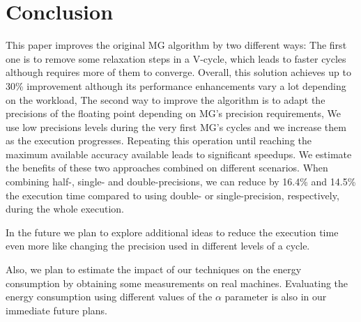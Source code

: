 \section{Conclusion}
\label{sec:conclusions}

This paper improves the original MG algorithm by two different ways: The first
one is to remove some relaxation steps in a V-cycle, which leads to faster
cycles although requires more of them to converge.  Overall, this solution
achieves up to 30\% improvement although its performance enhancements vary a
lot depending on the workload, The second way to improve the algorithm is to
adapt the precisions of the floating point depending on MG's precision
requirements, We use low precisions levels during the very first MG's cycles
and we increase them as the execution progresses.  Repeating this operation
until reaching the maximum available accuracy available leads to significant
speedups.  We estimate the benefits of these two approaches combined on
different scenarios.  When combining half-, single- and double-precisions, we
can reduce by 16.4\% and 14.5\% the execution time compared to using double- or
single-precision, respectively, during the whole execution.

In the future we plan to explore additional ideas to reduce the execution time
even more like changing the precision used in different levels of a cycle.


Also, we plan to estimate the impact of our techniques on the energy
consumption by obtaining some measurements on real machines.  Evaluating the
energy consumption using different values of the $\alpha$ parameter is also in
our immediate future plans.



